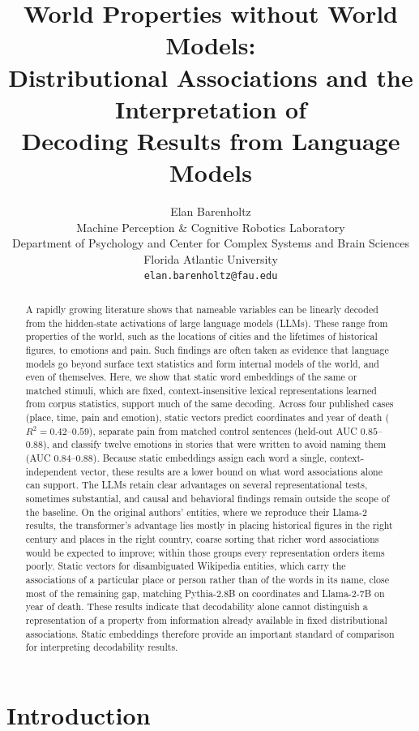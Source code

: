 \documentclass[11pt]{article}
\title{World Properties without World Models:\\
  Distributional Associations and the Interpretation of\\
  Decoding Results from Language Models}
\author{Elan Barenholtz\\
  Machine Perception \& Cognitive Robotics Laboratory\\
  Department of Psychology and Center for Complex Systems and Brain Sciences\\
  Florida Atlantic University\\
  \texttt{elan.barenholtz@fau.edu}}
\date{}
\begin{document}
\maketitle

\begin{abstract}
A rapidly growing literature shows that nameable variables can be linearly decoded from the hidden-state activations of large language models (LLMs). These range from properties of the world, such as the locations of cities and the lifetimes of historical figures, to emotions and pain. Such findings are often taken as evidence that language models go beyond surface text statistics and form internal models of the world, and even of themselves. Here, we show that static word embeddings of the same or matched stimuli, which are fixed, context-insensitive lexical representations learned from corpus statistics, support much of the same decoding. Across four published cases (place, time, pain and emotion), static vectors predict coordinates and year of death ($R^2 = 0.42$--$0.59$), separate pain from matched control sentences (held-out AUC $0.85$--$0.88$), and classify twelve emotions in stories that were written to avoid naming them (AUC $0.84$--$0.88$). Because static embeddings assign each word a single, context-independent vector, these results are a lower bound on what word associations alone can support. The LLMs retain clear advantages on several representational tests, sometimes substantial, and causal and behavioral findings remain outside the scope of the baseline. On the original authors' entities, where we reproduce their Llama-2 results, the transformer's advantage lies mostly in placing historical figures in the right century and places in the right country, coarse sorting that richer word associations would be expected to improve; within those groups every representation orders items poorly. Static vectors for disambiguated Wikipedia entities, which carry the associations of a particular place or person rather than of the words in its name, close most of the remaining gap, matching Pythia-2.8B on coordinates and Llama-2-7B on year of death.  These results indicate that decodability alone cannot distinguish a representation of a property from information already available in fixed distributional associations. Static embeddings therefore provide an important standard of comparison for interpreting decodability results. 
\end{abstract}

\section{Introduction}
\end{document}
